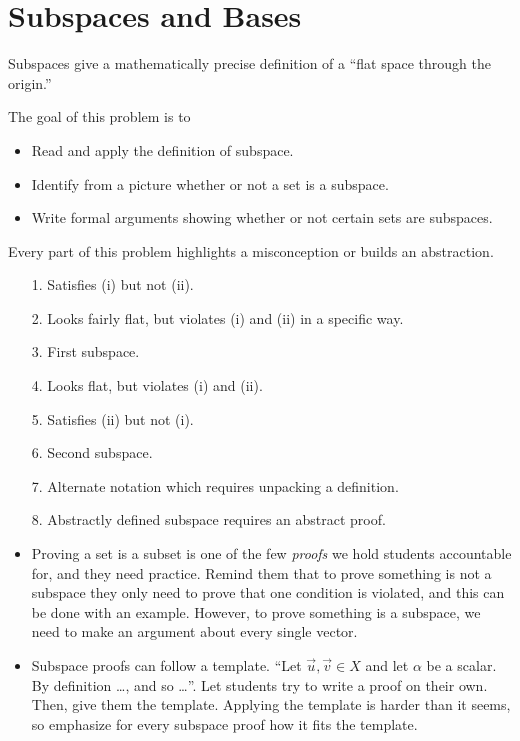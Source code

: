 \section*{Subspaces and Bases}
	\vspace{-1em}

	Subspaces give a mathematically precise definition of a ``flat space through the origin.''

	\question
	\begin{annotation}
		\begin{goals}

			The goal of this problem is to
			\begin{itemize}
				\item Read and apply the definition of subspace.
				\item Identify from a picture whether or not a set is a subspace.
				\item Write formal arguments showing whether or not certain sets are subspaces.
			\end{itemize}
		\end{goals}

		\begin{notes}
			Every part of this problem highlights a misconception or builds an abstraction.
			\begin{enumerate}
				\item[1.] Satisfies (i) but not (ii).
				\item[2.] Looks fairly flat, but violates (i) and (ii) in a specific way.
				\item[3.] First subspace.
				\item[4.] Looks flat, but violates (i) and (ii).
				\item[5.] Satisfies (ii) but not (i).
				\item[6.] Second subspace.
				\item[7.] Alternate notation which requires unpacking a definition.
				\item[8.] Abstractly defined subspace requires an abstract proof.
			\end{enumerate}
			\begin{itemize}
				\item Proving a set is a subset is one of the few \emph{proofs} we hold
					students accountable for, and they need practice. Remind them
					that to prove something is not a subspace they only need to
					prove that one condition is violated, and this can be done with
					an example. However, to prove something is a subspace, we need
					to make an argument about every single vector.
				\item Subspace proofs can follow a template. ``Let $\vec u,\vec v\in X$ and
					let $\alpha$ be a scalar. By definition \ldots, and so \ldots''. Let
					students try to write a proof on their own. Then, give them
					the template. Applying the template is harder than it seems, so
					emphasize for every subspace proof how it fits the template.
			\end{itemize}
		\end{notes}
	\end{annotation}

